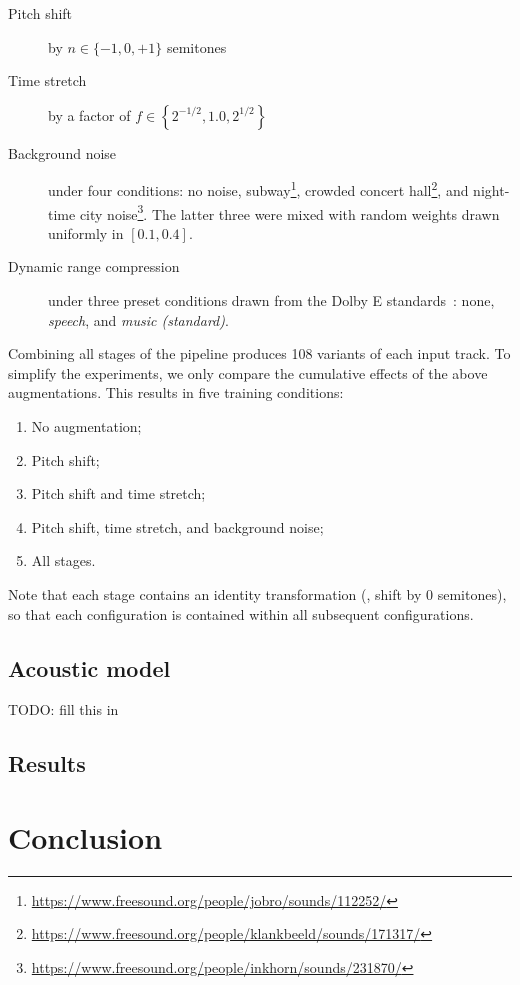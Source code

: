 \documentclass{article}
\begin{document}
\begin{description}
    \item[Pitch shift] by $n \in \{-1, 0, +1\}$ semitones
    \item[Time stretch] by a factor of $f \in \left\{ 2^{-1/2}, 1.0, 2^{1/2}\right\}$
    \item[Background noise] under four conditions: no noise,
        subway\footnote{\url{https://www.freesound.org/people/jobro/sounds/112252/}},
        crowded concert hall\footnote{\url{https://www.freesound.org/people/klankbeeld/sounds/171317/}},
        and night-time city noise\footnote{\url{https://www.freesound.org/people/inkhorn/sounds/231870/}}.
        The latter three were mixed with random weights drawn uniformly in $[0.1, 0.4]$.
    \item[Dynamic range compression] under three preset conditions drawn from the {Dolby E}
        standards~\cite{dolbyE}: none, \emph{speech},
        and \emph{music (standard)}.
\end{description}

Combining all stages of the pipeline produces 108 variants of each input track.  To
simplify the experiments, we only compare the cumulative effects of the above
augmentations.  This results in five training conditions:
\begin{enumerate}
    \item No augmentation;
        \vspace{-.5\baselineskip}
    \item Pitch shift;
        \vspace{-.5\baselineskip}
    \item Pitch shift and time stretch;
        \vspace{-.5\baselineskip}
    \item Pitch shift, time stretch, and background noise;
        \vspace{-.5\baselineskip}
    \item All stages.
\end{enumerate}
Note that each stage contains an identity transformation (\eg, shift by $0$ semitones),
so that each configuration is contained within all subsequent configurations.

\subsection{Acoustic model}

TODO: fill this in

\subsection{Results}

\section{Conclusion}


\end{document}
